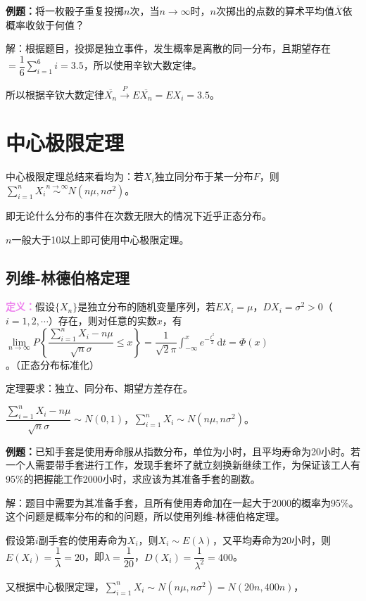 \documentclass[UTF8, 12pt]{ctexart}
\begin{document}
\textbf{例题：}将一枚骰子重复投掷$n$次，当$n\to\infty$时，$n$次掷出的点数的算术平均值$\overline{X}$依概率收敛于何值？

解：根据题目，投掷是独立事件，发生概率是离散的同一分布，且期望存在$=\dfrac{1}{6}\sum\limits_{i=1}^6i=3.5$，所以使用辛钦大数定律。

所以根据辛钦大数定律$\overline{X_n}\overset{P}{\rightarrow}E\overline{X_n}=EX_i=3.5$。

\section{中心极限定理}

中心极限定理总结来看均为：若$X_i$独立同分布于某一分布$F$，则$\sum\limits_{i=1}^nX_i\overset{n\to\infty}{\sim}N(n\mu,n\sigma^2)$。

即无论什么分布的事件在次数无限大的情况下近乎正态分布。

$n$一般大于10以上即可使用中心极限定理。

\subsection{列维-林德伯格定理}

\textcolor{violet}{\textbf{定义：}}假设$\{X_n\}$是独立分布的随机变量序列，若$EX_i=\mu$，$DX_i=\sigma^2>0$（$i=1,2,\cdots$）存在，则对任意的实数$x$，有$\lim\limits_{n\to\infty}P\left\{\dfrac{\sum\limits_{i=1}^nX_i-n\mu}{\sqrt{n}\sigma}\leqslant x\right\}=\dfrac{1}{\sqrt{2}\pi}\int_{-\infty}^xe^{-\frac{t^2}{2}}\,\textrm{d}t=\varPhi(x)$。（正态分布标准化）

定理要求：独立、同分布、期望方差存在。

$\dfrac{\sum\limits_{i=1}^nX_i-n\mu}{\sqrt{n}\sigma}\sim N(0,1)$，$\sum\limits_{i=1}^nX_i\sim N(n\mu,n\sigma^2)$。

\textbf{例题：}已知手套是使用寿命服从指数分布，单位为小时，且平均寿命为20小时。若一个人需要带手套进行工作，发现手套坏了就立刻换新继续工作，为保证该工人有95\%的把握能工作2000小时，求应该为其准备手套的副数。

解：题目中需要为其准备手套，且所有使用寿命加在一起大于2000的概率为95\%。这个问题是概率分布的和的问题，所以使用列维-林德伯格定理。

假设第$i$副手套的使用寿命为$X_i$，则$X_i\sim E(\lambda)$，又平均寿命为$20$小时，则$E(X_i)=\dfrac{1}{\lambda}=20$，即$\lambda=\dfrac{1}{20}$，$D(X_i)=\dfrac{1}{\lambda^2}=400$。

又根据中心极限定理，$\sum\limits_{i=1}^nX_i\sim N(n\mu,n\sigma^2)=N(20n,400n)$，
\end{document}
